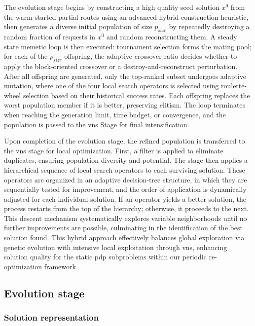 \documentclass[pdflatex]{sn-jnl}
\begin{document}
The evolution stage begins by constructing a high quality seed solution \(x^0\) from the warm started partial routes using an advanced hybrid construction heuristic, then generates a diverse initial population of size \(p_{size}\) by repeatedly destroying a random fraction of requests in \(x^0\) and random reconstructing them. A steady state memetic loop is then executed: tournament selection forms the mating pool; for each of the \(p_{size}\) offspring, the adaptive crossover ratio decides whether to apply the block-oriented crossover or a destroy-and-reconstruct perturbation. After all offspring are generated, only the top-ranked subset undergoes adaptive mutation, where one of the four local search operators is selected using roulette-wheel selection based on their historical success rates. Each offspring replaces the worst population member if it is better, preserving elitism. The loop terminates when reaching the generation limit, time budget, or convergence, and the population is passed to the \gls{vns} Stage for final intensification.

Upon completion of the evolution stage, the refined population is transferred to the \gls{vns} stage for local optimization. First, a filter is applied to eliminate duplicates, ensuring population diversity and potential. The stage then applies a hierarchical sequence of local search operators to each surviving solution. These operators are organized in an adaptive decision-tree structure, in which they are sequentially tested for improvement, and the order of application is dynamically adjusted for each individual solution. If an operator yields a better solution, the process restarts from the top of the hierarchy; otherwise, it proceeds to the next. This descent mechanism systematically explores variable neighborhoods until no further improvements are possible, culminating in the identification of the best solution found. This hybrid approach effectively balances global exploration via genetic evolution with intensive local exploitation through \gls{vns}, enhancing solution quality for the static \gls{pdp} subproblems within our periodic re-optimization framework.

\subsection{Evolution stage}
\subsubsection{Solution representation}
\end{document}
